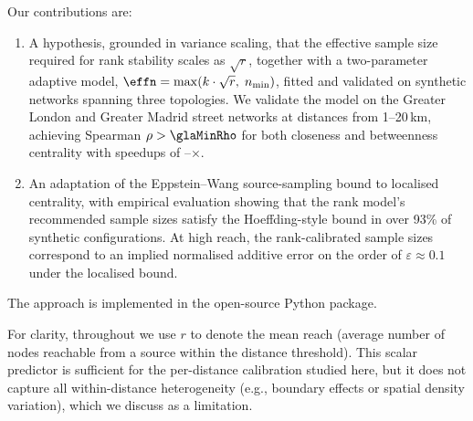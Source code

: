 Our contributions are:
\begin{enumerate}
  \item A hypothesis, grounded in variance scaling, that the effective sample size required for rank stability scales as $\sqrt{r}$, together with a two-parameter adaptive model, $\effn = \max(k \cdot \sqrt{r},\; n_{\min})$, fitted and validated on synthetic networks spanning three topologies. We validate the model on the Greater London and Greater Madrid street networks at distances from 1--20\,km, achieving Spearman $\rho > \glaMinRho$ for both closeness and betweenness centrality with speedups of \glaFiveKmSpeedup{}--\glaTwentyKmSpeedup{}$\times$.
  \item An adaptation of the Eppstein--Wang source-sampling bound to localised centrality, with empirical evaluation showing that the rank model's recommended sample sizes satisfy the Hoeffding-style bound in over 93\% of synthetic configurations. At high reach, the rank-calibrated sample sizes correspond to an implied normalised additive error on the order of $\varepsilon \approx 0.1$ under the localised bound.
\end{enumerate}
The approach is implemented in the open-source \cityseer{} Python package.

For clarity, throughout we use $r$ to denote the mean reach (average number of nodes reachable from a source within the distance threshold). This scalar predictor is sufficient for the per-distance calibration studied here, but it does not capture all within-distance heterogeneity (e.g., boundary effects or spatial density variation), which we discuss as a limitation.
